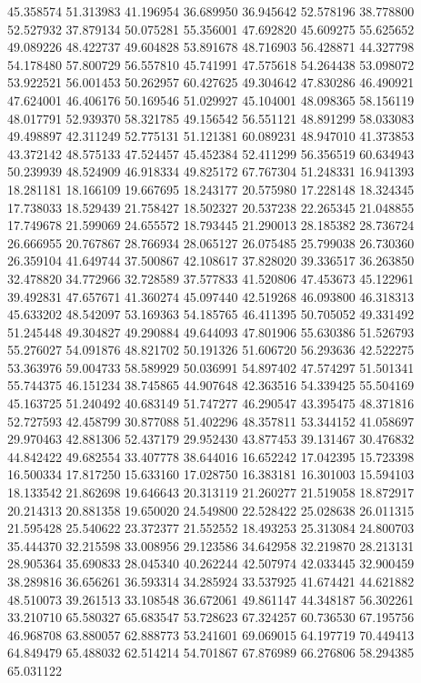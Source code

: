 45.358574
51.313983
41.196954
36.689950
36.945642
52.578196
38.778800
52.527932
37.879134
50.075281
55.356001
47.692820
45.609275
55.625652
49.089226
48.422737
49.604828
53.891678
48.716903
56.428871
44.327798
54.178480
57.800729
56.557810
45.741991
47.575618
54.264438
53.098072
53.922521
56.001453
50.262957
60.427625
49.304642
47.830286
46.490921
47.624001
46.406176
50.169546
51.029927
45.104001
48.098365
58.156119
48.017791
52.939370
58.321785
49.156542
56.551121
48.891299
58.033083
49.498897
42.311249
52.775131
51.121381
60.089231
48.947010
41.373853
43.372142
48.575133
47.524457
45.452384
52.411299
56.356519
60.634943
50.239939
48.524909
46.918334
49.825172
67.767304
51.248331
16.941393
18.281181
18.166109
19.667695
18.243177
20.575980
17.228148
18.324345
17.738033
18.529439
21.758427
18.502327
20.537238
22.265345
21.048855
17.749678
21.599069
24.655572
18.793445
21.290013
28.185382
28.736724
26.666955
20.767867
28.766934
28.065127
26.075485
25.799038
26.730360
26.359104
41.649744
37.500867
42.108617
37.828020
39.336517
36.263850
32.478820
34.772966
32.728589
37.577833
41.520806
47.453673
45.122961
39.492831
47.657671
41.360274
45.097440
42.519268
46.093800
46.318313
45.633202
48.542097
53.169363
54.185765
46.411395
50.705052
49.331492
51.245448
49.304827
49.290884
49.644093
47.801906
55.630386
51.526793
55.276027
54.091876
48.821702
50.191326
51.606720
56.293636
42.522275
53.363976
59.004733
58.589929
50.036991
54.897402
47.574297
51.501341
55.744375
46.151234
38.745865
44.907648
42.363516
54.339425
55.504169
45.163725
51.240492
40.683149
51.747277
46.290547
43.395475
48.371816
52.727593
42.458799
30.877088
51.402296
48.357811
53.344152
41.058697
29.970463
42.881306
52.437179
29.952430
43.877453
39.131467
30.476832
44.842422
49.682554
33.407778
38.644016
16.652242
17.042395
15.723398
16.500334
17.817250
15.633160
17.028750
16.383181
16.301003
15.594103
18.133542
21.862698
19.646643
20.313119
21.260277
21.519058
18.872917
20.214313
20.881358
19.650020
24.549800
22.528422
25.028638
26.011315
21.595428
25.540622
23.372377
21.552552
18.493253
25.313084
24.800703
35.444370
32.215598
33.008956
29.123586
34.642958
32.219870
28.213131
28.905364
35.690833
28.045340
40.262244
42.507974
42.033445
32.900459
38.289816
36.656261
36.593314
34.285924
33.537925
41.674421
44.621882
48.510073
39.261513
33.108548
36.672061
49.861147
44.348187
56.302261
33.210710
65.580327
65.683547
53.728623
67.324257
60.736530
67.195756
46.968708
63.880057
62.888773
53.241601
69.069015
64.197719
70.449413
64.849479
65.488032
62.514214
54.701867
67.876989
66.276806
58.294385
65.031122
